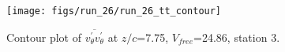 \begin{figure}[H]
\centering
\texttt{[image: figs/run\_26/run\_26\_tt\_contour]}
\caption{Contour plot of $\overline{v_{\theta}^{\prime} v_{\theta}^{\prime}}$ at $z/c$=7.75, $V_{free}$=24.86, station 3.}
\label{fig:run_26_tt_contour}
\end{figure}


